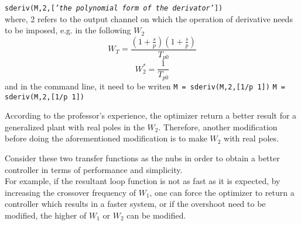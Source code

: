 \texttt{sderiv(M,2,[\textit{'the polynomial form of the derivator'}])} \\

where, 2 refers to the output channel on which the operation of derivative needs to be imposed, e.g. in the following $W_2$
\[
W_T = \frac{(1 + \frac{s}{p})(1 + \frac{s}{p})}{T_{p0}}
\]
\[
W_2^{*} = \frac{1}{T_{p0}}
\]
and in the command line, it need to be writen
\texttt{M = sderiv(M,2,[1/p 1])}
\texttt{M = sderiv(M,2,[1/p 1])}

\begin{factbox}[Experience]
According to the professor's experience, the optimizer return a better result for a generalized plant with real poles in the $W_2$. Therefore, another modification before doing the aforementioned modification is to make $W_2$ with real poles. 
\end{factbox}

\begin{QandAbox}
Consider these two transfer functions as the nubs in order to obtain a better controller in terms of performance and simplicity. \\

For example, if the resultant loop function is not as fast as it is expected, by increasing the crossover frequency of $W_1$, one can force the optimizer to return a controller which results in a faster system, or if the overshoot need to be modified, the higher of $W_1$ or $W_2$ can be modified.
\end{QandAbox}

